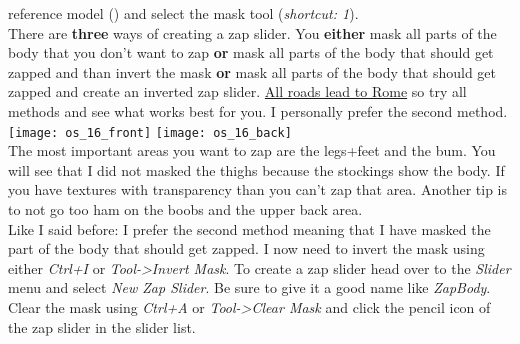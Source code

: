 reference model ({\color{green}{BaseFBody}}) and select the mask tool (\textit{shortcut: 1}).\\
There are \textbf{three} ways of creating a zap slider. You \textbf{either} mask all parts of the body that you don't want to zap 
\textbf{or} mask all parts of the body that should get zapped and than invert the mask \textbf{or} mask all parts of the body that should get zapped
and create an inverted zap slider. \href{https://idioms.thefreedictionary.com/all+roads+lead+to+Rome}{All roads lead to Rome} 
so try all methods and see what works best for you. I personally prefer the second method.\\
\texttt{[image: os\_16\_front]}
\texttt{[image: os\_16\_back]}\\
The most important areas you want to zap are the legs+feet and the bum. You will see that I did not masked the thighs because 
the stockings show the body. If you have textures with transparency than you can't zap that area. Another tip is to not go too ham 
on the boobs and the upper back area.\\
Like I said before: I prefer the second method meaning that I have masked the part of the body that should get zapped. I now need 
to invert the mask using either \textit{Ctrl+I} or \textit{Tool->Invert Mask}. To create a zap slider head over to the \textit{Slider} 
menu and select \textit{New Zap Slider}. Be sure to give it a good name like \textit{ZapBody}.
Clear the mask using \textit{Ctrl+A} or \textit{Tool->Clear Mask} and click the pencil icon of the zap slider in the slider list.

